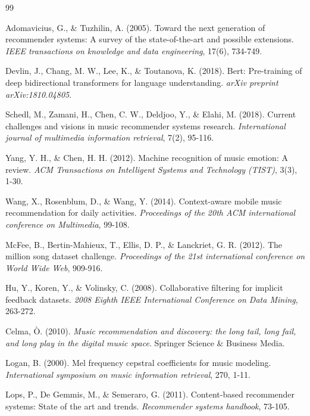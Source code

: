 \documentclass[12pt,a4paper]{article}
\begin{document}
\begin{thebibliography}{99}

Adomavicius, G., \& Tuzhilin, A. (2005). Toward the next generation of recommender systems: A survey of the state-of-the-art and possible extensions. \textit{IEEE transactions on knowledge and data engineering}, 17(6), 734-749.

Devlin, J., Chang, M. W., Lee, K., \& Toutanova, K. (2018). Bert: Pre-training of deep bidirectional transformers for language understanding. \textit{arXiv preprint arXiv:1810.04805}.

Schedl, M., Zamani, H., Chen, C. W., Deldjoo, Y., \& Elahi, M. (2018). Current challenges and visions in music recommender systems research. \textit{International journal of multimedia information retrieval}, 7(2), 95-116.

Yang, Y. H., \& Chen, H. H. (2012). Machine recognition of music emotion: A review. \textit{ACM Transactions on Intelligent Systems and Technology (TIST)}, 3(3), 1-30.

Wang, X., Rosenblum, D., \& Wang, Y. (2014). Context-aware mobile music recommendation for daily activities. \textit{Proceedings of the 20th ACM international conference on Multimedia}, 99-108.

McFee, B., Bertin-Mahieux, T., Ellis, D. P., \& Lanckriet, G. R. (2012). The million song dataset challenge. \textit{Proceedings of the 21st international conference on World Wide Web}, 909-916.

Hu, Y., Koren, Y., \& Volinsky, C. (2008). Collaborative filtering for implicit feedback datasets. \textit{2008 Eighth IEEE International Conference on Data Mining}, 263-272.

Celma, Ò. (2010). \textit{Music recommendation and discovery: the long tail, long fail, and long play in the digital music space}. Springer Science \& Business Media.

Logan, B. (2000). Mel frequency cepstral coefficients for music modeling. \textit{International symposium on music information retrieval}, 270, 1-11.

Lops, P., De Gemmis, M., \& Semeraro, G. (2011). Content-based recommender systems: State of the art and trends. \textit{Recommender systems handbook}, 73-105.


\end{thebibliography}
\end{document}
